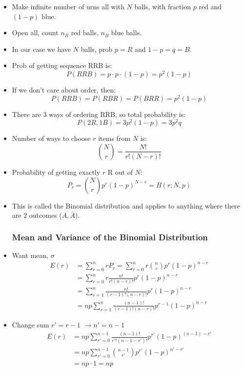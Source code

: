\begin{itemize}
    \item Make infinite number of urns all with $N$ balls, with fraction $p$ red and $(1-p)$ blue.
    \item Open all, count $n_R$ red balls, $n_B$ blue balls.
    \item In our case we have $N$ balls, prob $p=R$ and $1-p=q=B$.
    \item Prob of getting sequence RRB is:
          \[ P(RRB) = p \cdot p \cdot (1-p) = p^2 (1-p) \]
    \item If we don't care about order, then:
          \[ P(RRB) = P(RBR) = P(BRR) = p^2 (1-p) \]
    \item There are 3 ways of ordering RRB, so total probability is:
          \[ P(2R,1B) = 3 p^2 (1-p) = 3 p^2 q \]
    \item Number of ways to choose $r$ items from $N$ is:
          \[ \binom{N}{r} = \frac{N!}{r!(N-r)!} \]
    \item Probability of getting exactly $r$ R out of $N$:
          \[ P_r = \binom{N}{r} p^r (1-p)^{N-r} = B(r;N,p) \]
    \item This is called the Binomial distribution and applies to anything where there are 2 outcomes ($A, \bar{A}$).

          \subsubsection*{Mean and Variance of the Binomial Distribution}

    \item Want mean, $\sigma$
          \begin{align*}
              E(r) & = \sum_{r=0}^n r P_r = \sum_{r=0}^n r \binom{n}{r} p^r (1-p)^{n-r} \\
                   & = \sum_{r=0}^n r \frac{n!}{r!(n-r)!} p^r (1-p)^{n-r}               \\
                   & = \sum_{r=1}^n \frac{n!}{(r-1)!(n-r)!} p^r (1-p)^{n-r}             \\
                   & = np \sum_{r=1}^n \frac{(n-1)!}{(r-1)!(n-r)!} p^{r-1} (1-p)^{n-r}
          \end{align*}
    \item Change sum $r' = r-1$ $\rightarrow n' = n-1$
          \begin{align*}
              E(r) & = np \sum_{r'=0}^{n-1} \frac{(n-1)!}{r'!(n-1-r')!} p^{r'} (1-p)^{(n-1)-r'} \\
                   & = np \sum_{r'=0}^{n-1} \binom{n-1}{r'} p^{r'} (1-p)^{n'-r'}                \\
                   & = np \cdot 1 = np
          \end{align*}


\end{itemize}
